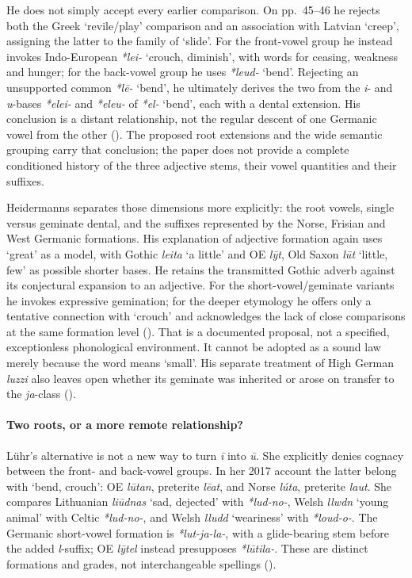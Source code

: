 \documentclass[
  british,
  a4paper,
]{article}
\begin{document}
He does not simply accept every earlier comparison. On pp.~45--46 he
rejects both the Greek `revile/play' comparison and an association with
Latvian `creep', assigning the latter to the family of `slide'. For the
front-vowel group he instead invokes Indo-European \emph{*lei-} `crouch,
diminish', with words for ceasing, weakness and hunger; for the
back-vowel group he uses \emph{*leud-} `bend'. Rejecting an unsupported
common \emph{*lē-} `bend', he ultimately derives the two from the
\emph{i}- and \emph{u}-bases \emph{*elei-} and \emph{*eleu-} of
\emph{*el-} `bend', each with a dental extension. His conclusion is a
distant relationship, not the regular descent of one Germanic vowel from
the other (). The
proposed root extensions and the wide semantic grouping carry that
conclusion; the paper does not provide a complete conditioned history of
the three adjective stems, their vowel quantities and their suffixes.

Heidermanns separates those dimensions more explicitly: the root vowels,
single versus geminate dental, and the suffixes represented by the
Norse, Frisian and West Germanic formations. His explanation of
adjective formation again uses `great' as a model, with Gothic
\emph{leita} `a little' and OE \emph{lȳt}, Old Saxon \emph{lūt} `little,
few' as possible shorter bases. He retains the transmitted Gothic adverb
against its conjectural expansion to an adjective. For the
short-vowel/geminate variants he invokes expressive gemination; for the
deeper etymology he offers only a tentative connection with `crouch' and
acknowledges the lack of close comparisons at the same formation level
(). That is a
documented proposal, not a specified, exceptionless phonological
environment. It cannot be adopted as a sound law merely because the word
means `small'. His separate treatment of High German \emph{luzzi} also
leaves open whether its geminate was inherited or arose on transfer to
the \emph{ja}-class ().

\paragraph{Two roots, or a more remote
relationship?}\label{two-roots-or-a-more-remote-relationship}

Lühr's alternative is not a new way to turn \emph{ī} into \emph{ū}. She
explicitly denies cognacy between the front- and back-vowel groups. In
her 2017 account the latter belong with `bend, crouch': OE \emph{lūtan},
preterite \emph{lēat}, and Norse \emph{lúta}, preterite \emph{laut}. She
compares Lithuanian \emph{liūdnas} `sad, dejected' with \emph{*lud-no-},
Welsh \emph{llwdn} `young animal' with Celtic \emph{*lud-no-}, and Welsh
\emph{lludd} `weariness' with \emph{*loud-o-}. The Germanic short-vowel
formation is \emph{*lut-ja-la-}, with a glide-bearing stem before the
added \emph{l}-suffix; OE \emph{lȳtel} instead presupposes
\emph{*lūtila-}. These are distinct formations and grades, not
interchangeable spellings ().
\end{document}

